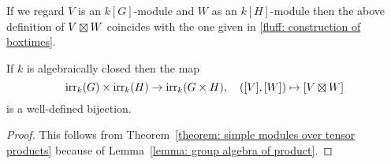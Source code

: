 \begin{remark}
  If we regard $V$ is an $k[G]$-module and $W$ as an $k[H]$-module then the above definition of $V \outertensor W$ coincides with the one given in \ref{fluff: construction of boxtimes}.
\end{remark}


\begin{corollary}
  \label{corollary: irr rep of products}
  If $k$ is algebraically closed then the map
  \[
            \irr_k(G) \times \irr_k(H)
    \to     \irr_k(G \times H),
    \quad   ([V],[W])
    \mapsto [V \mathbin{\outertensor} W]
  \]
  is a well-defined bijection.
\end{corollary}


\begin{proof}
  This follows from Theorem~\ref{theorem: simple modules over tensor products} because of Lemma~\ref{lemma: group algebra of product}.
\end{proof}




